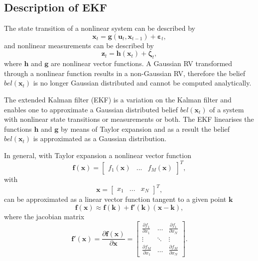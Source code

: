 \documentclass[12pt,oneside,openany,a4paper, %
afrikaans,english,
]{memoir}
\numberwithin{equation}{chapter}
\begin{document}
\subsection{Description of EKF}
The state transition of a nonlinear system can be described by
\begin{equation}
\bm{x}_t = \bm{g}(\bm{u}_t, \bm{x}_{t-1}) + \bm{\varepsilon}_t,
\end{equation}
and nonlinear measurements can be described by
\begin{equation}
\bm{z}_t = \bm{h}(\bm{x}_t) + \bm{\zeta}_t,
\end{equation}
where $\bm{h}$ and $\bm{g}$ are nonlinear vector functions. A Gaussian RV transformed through a nonlinear function results in a non-Gaussian RV, therefore the belief $bel(\bm{x}_t)$ is no longer Gaussian distributed and cannot be computed analytically.

The extended Kalman filter (EKF) is a variation on the Kalman filter and enables one to approximate a Gaussian distributed belief $bel({\bm{x}_t})$ of a system with nonlinear state transitions or measurements or both. The EKF linearises the functions $\bm{h}$ and $\bm{g}$ by means of Taylor expansion and as a result the belief $bel(\bm{x}_t)$ is approximated as a Gaussian distribution. 

In general, with Taylor expansion a nonlinear vector function
\begin{equation}\label{eq: taylorLin}
\bm{f}(\bm{x}) =
\begin{bmatrix}
f_1(\bm{x}) & ... & f_M(\bm{x})
\end{bmatrix}^T,
\end{equation}
with
\begin{equation}
\bm{x} =
\begin{bmatrix}
x_1 & ... & x_N
\end{bmatrix}^T,
\end{equation}
can be approximated as a linear vector function tangent to a given point $\bm{k}$ 
\begin{equation}
\bm{f}(\bm{x}) \approx \bm{f}(\bm{k}) + \bm{f}'(\bm{k})(\bm{x-k}),
\end{equation}
where the jacobian matrix
\begin{equation}\label{eq:jacobian}
\bm{f}'(\bm{x}) = \frac{\partial\bm{f}(\bm{x})}{\partial \bm{x}} =
\begin{bmatrix}
\frac{\partial f_1}{\partial x_1} & \dots &\frac{\partial f_1}{\partial x_N}\\
\vdots & \ddots &\vdots\\
\frac{\partial f_M}{\partial x_1} & \dots &\frac{\partial f_M}{\partial x_N}
\end{bmatrix}.
\end{equation}
\end{document}
